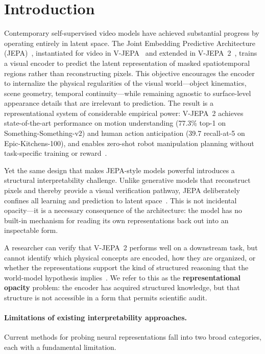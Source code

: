 \documentclass{article}
\begin{document}
\section{Introduction}
\label{sec:intro}

Contemporary self-supervised video models have achieved substantial
progress by operating entirely in latent space.
The Joint Embedding Predictive Architecture
(JEPA)~\cite{lecun2022path}, instantiated for video in
V-JEPA~\cite{bardes2024vjepa} and extended in
V-JEPA~2~\cite{assran2025vjepa2}, trains a visual encoder to predict
the latent representation of masked spatiotemporal regions rather than
reconstructing pixels.
This objective encourages the encoder to internalize the physical
regularities of the visual world---object kinematics, scene geometry,
temporal continuity---while remaining agnostic to surface-level
appearance details that are irrelevant to prediction.
The result is a representational system of considerable empirical
power: V-JEPA~2 achieves state-of-the-art performance on motion
understanding (77.3\% top-1 on Something-Something-v2) and human
action anticipation (39.7 recall-at-5 on Epic-Kitchens-100), and
enables zero-shot robot manipulation planning without task-specific
training or reward~\cite{assran2025vjepa2}.

Yet the same design that makes JEPA-style models powerful introduces a structural interpretability challenge. Unlike generative models that reconstruct pixels and thereby provide a visual verification pathway, JEPA deliberately confines all learning and prediction to latent space~\cite{lecun2022path}. This is not incidental opacity---it is a necessary consequence of the architecture: the model has no built-in mechanism for reading its own representations back out into an inspectable form. 


A researcher can verify that V-JEPA~2 performs well on a downstream
task, but cannot identify which physical concepts are encoded, how
they are organized, or whether the representations support the kind of
structured reasoning that the world-model hypothesis
implies~\cite{lecun2022path}.
We refer to this as the \textbf{representational opacity} problem: the
encoder has acquired structured knowledge, but that structure is not
accessible in a form that permits scientific audit.

\paragraph{Limitations of existing interpretability approaches.}
Current methods for probing neural representations fall into two broad
categories, each with a fundamental limitation.
\end{document}
